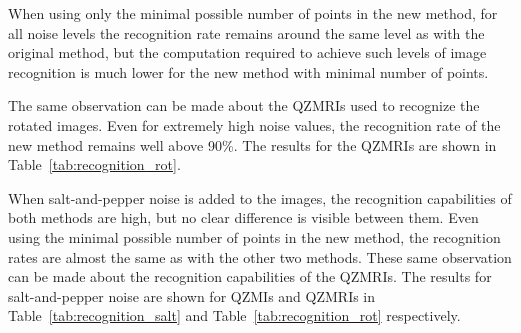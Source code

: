 When using only the minimal possible number of points in the new method, for all noise levels the recognition rate remains around the same level as with the original method, but the computation required to achieve such levels of image recognition is much lower for the new method with minimal number of points.

The same observation can be made about the QZMRIs used to recognize the rotated images. Even for extremely high noise values, the recognition rate of the new method remains well above 90\%. The results for the QZMRIs are shown in Table~\ref{tab:recognition_rot}.


When salt-and-pepper noise is added to the images, the recognition capabilities of both methods are high, but no clear difference is visible between them. Even using the minimal possible number of points in the new method, the recognition rates are almost the same as with the other two methods. 
These same observation can be made about the recognition capabilities of the QZMRIs.
The results for salt-and-pepper noise are shown for QZMIs and QZMRIs in Table~\ref{tab:recognition_salt} and Table~\ref{tab:recognition_rot} respectively.

